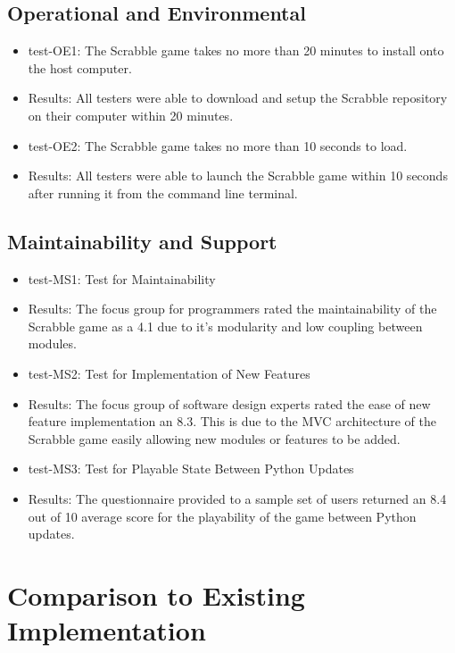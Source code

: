 \documentclass[12pt, titlepage]{article}
\begin{document}
\subsection{Operational and Environmental}
\begin{itemize}
    \item test-OE1: The Scrabble game takes no more than 20 minutes to install onto the host computer.
    \item Results: All testers were able to download and setup the Scrabble repository on their computer within 20 minutes.
    \item test-OE2: The Scrabble game takes no more than 10 seconds to load.
    \item Results: All testers were able to launch the Scrabble game within 10 seconds after running it from the command line terminal.
\end{itemize}

\subsection{Maintainability and Support}
\begin{itemize}
    \item test-MS1: Test for Maintainability
    \item Results: The focus group for programmers rated the maintainability of the Scrabble game as a 4.1 due to it's modularity and low coupling between modules.
    \item test-MS2: Test for Implementation of New Features
    \item Results: The focus group of software design experts rated the ease of new feature implementation an 8.3. This is due to the MVC architecture of the Scrabble game easily allowing new modules or features to be added.
    \item test-MS3: Test for Playable State Between Python Updates
    \item Results: The questionnaire provided to a sample set of users returned an 8.4 out of 10 average score for the playability of the game between Python updates.
\end{itemize}
	
\section{Comparison to Existing Implementation}	
\end{document}
